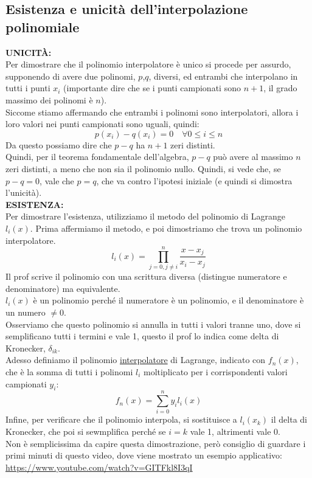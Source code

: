 \subsection{Esistenza e unicità dell'interpolazione polinomiale}
\textbf{UNICITÀ:}\\
Per dimostrare che il polinomio interpolatore è unico si procede per assurdo, supponendo di avere due polinomi, $p$,$q$, diversi, ed entrambi che interpolano in tutti i punti $x_i$ (importante dire che se i punti campionati sono $n+1$, il grado massimo dei polinomi è $n$).\\
Siccome stiamo affermando che entrambi i polinomi sono interpolatori, allora i loro valori nei punti campionati sono uguali, quindi:
\begin{displaymath}
    p(x_i)-q(x_i)=0 \quad \forall 0 \leq i \leq n
\end{displaymath}
Da questo possiamo dire che $p-q$ ha $n+1$ zeri distinti.\\
Quindi, per il teorema fondamentale dell'algebra, $p-q$ può avere al massimo $n$ zeri distinti, a meno che non sia il polinomio nullo. Quindi, si vede che, se $p-q=0$, vale che $p=q$, che va contro l'ipotesi iniziale (e quindi si dimostra l'unicità).\\
\textbf{ESISTENZA:}\\
Per dimostrare l'esistenza, utilizziamo il metodo del polinomio di Lagrange $l_i(x)$. Prima affermiamo il metodo, e poi dimostriamo che trova un polinomio interpolatore.\\
\begin{displaymath}
    l_i(x)=\prod_{j=0,j\neq i}^{n}\frac{x-x_j}{x_i-x_j}
\end{displaymath}
Il prof scrive il polinomio con una scrittura diversa (distingue numeratore e denominatore) ma equivalente.\\
$l_i(x)$ è un polinomio perché il numeratore è un polinomio, e il denominatore è un numero $\neq 0$.\\
Osserviamo che questo polinomio si annulla in tutti i valori tranne uno, dove si semplificano tutti i termini e vale 1, questo il prof lo indica come delta di Kronecker, $\delta_{ik}$.\\
Adesso definiamo il polinomio \underline{interpolatore} di Lagrange, indicato con $f_n(x)$, che è la somma di tutti i polinomi $l_i$ moltiplicato per i corrispondenti valori campionati $y_i$:
\begin{displaymath}
    f_n(x)=\sum_{i=0}^{n}y_il_i(x)
\end{displaymath}
Infine, per verificare che il polinomio interpola, si sostituisce a $l_i(x_k)$ il delta di Kronecker, che poi si sewmplifica perché se $i=k$ vale 1, altrimenti vale 0.\\
Non è semplicissima da capire questa dimostrazione, però consiglio di guardare i primi minuti di questo video, dove viene mostrato un esempio applicativo:\\
\url{https://www.youtube.com/watch?v=GITFkl8I3qI}
